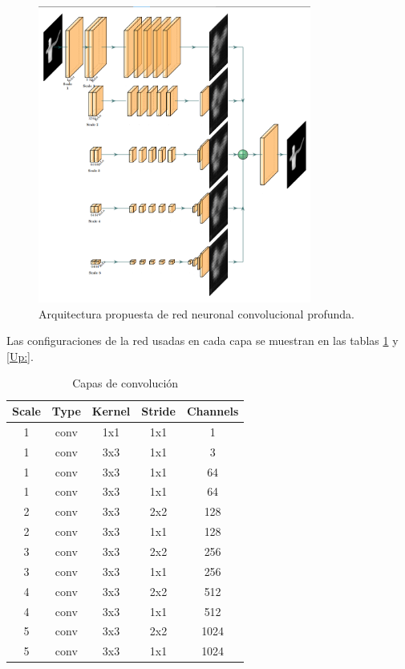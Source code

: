 \documentclass[10pt,letterpaper]{article}
\begin{document}
\begin{figure}[H]
	\centering
    \includegraphics[width=0.8\textwidth]{tifs/tif23.png}
    \caption{Arquitectura propuesta de red neuronal convolucional profunda.}
    \label{tif23}
\end{figure}

Las configuraciones de la red usadas en cada capa se muestran en las tablas \ref{Down:} y \ref{Up:}.

\begin{table}[H]
\begin{center}
\begin{tabular}{ c  c  c  c  c }
\hline
Scale & Type & Kernel & Stride & Channels\\	
\hline
1 & conv & 1x1 & 1x1 & 1 \\
\hline
1 & conv & 3x3 & 1x1 & 3 \\
\hline
1 & conv & 3x3 & 1x1 & 64 \\
1 & conv & 3x3 & 1x1 & 64 \\
\hline
2 & conv & 3x3 & 2x2 & 128 \\
2 & conv & 3x3 & 1x1 & 128 \\
\hline
3 & conv & 3x3 & 2x2 & 256 \\
3 & conv & 3x3 & 1x1 & 256 \\
\hline
4 & conv & 3x3 & 2x2 & 512 \\
4 & conv & 3x3 & 1x1 & 512 \\
\hline
5 & conv & 3x3 & 2x2 & 1024 \\
5 & conv & 3x3 & 1x1 & 1024 \\
\hline
\end{tabular}
\caption{Capas de convolución}
\label{Down:}
\end{center}
\end{table}
\end{document}
